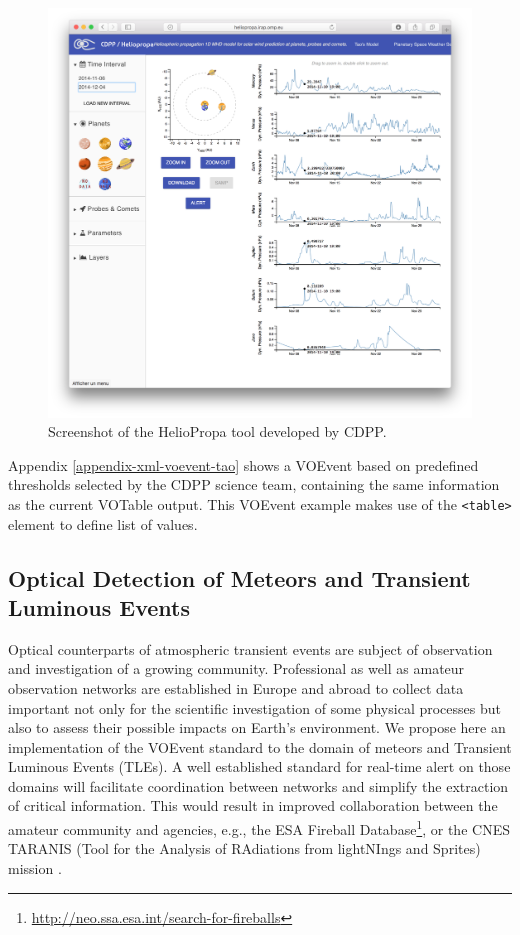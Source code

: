 \documentclass[referee,a4paper,12pt,traditabstract]{swsc}
\begin{document}
\begin{linenumbers}
\begin{figure}
\includegraphics[width=\linewidth]{heliopropa.png}
\caption{Screenshot of the HelioPropa tool developed by CDPP.}
\label{fig-heliopropa}
\end{figure}

Appendix \ref{appendix-xml-voevent-tao} shows a VOEvent based on predefined thresholds selected by the CDPP science team, containing the same information as the current VOTable output. This VOEvent example makes use of the {\tt <table>} element to define list of values.

\subsection{Optical Detection of Meteors and Transient Luminous Events}
Optical counterparts of atmospheric transient events are subject of observation and investigation of a growing community. Professional as well as amateur observation networks are established in Europe and abroad to collect data important not only for the scientific investigation of some physical processes but also to assess their possible impacts on Earth's environment. We propose here an implementation of the VOEvent standard to the domain of meteors and Transient Luminous Events (TLEs). A well established standard for real-time alert on those domains will facilitate coordination between networks and simplify the extraction of critical information. This would result in improved collaboration between the amateur community and agencies, e.g., the ESA Fireball Database\footnote{\url{http://neo.ssa.esa.int/search-for-fireballs}}, or the CNES TARANIS (Tool for the Analysis of RAdiations from lightNIngs and Sprites) mission \cite{2007AdSpR..40.1268B}. 


\end{linenumbers}
\end{document}
